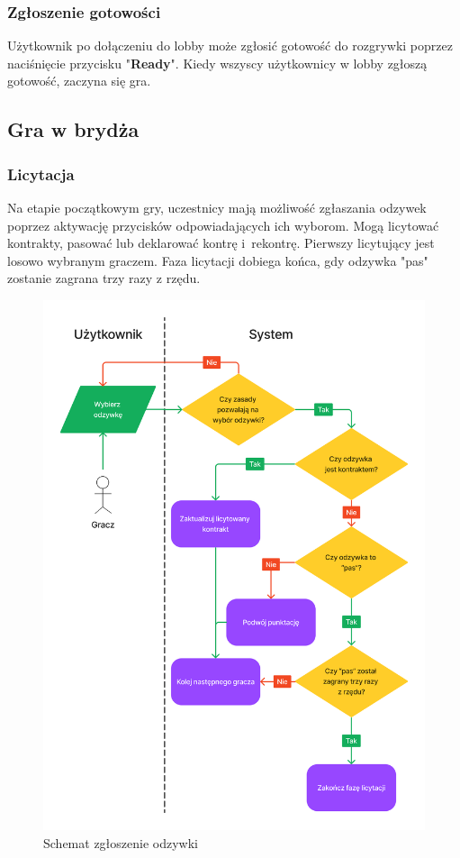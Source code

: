 \FloatBarrier

\subsubsection{Zgłoszenie gotowości}
Użytkownik po dołączeniu do lobby może zgłosić gotowość do rozgrywki poprzez
naciśnięcie przycisku "\textbf{Ready}". Kiedy wszyscy użytkownicy w lobby zgłoszą
gotowość, zaczyna się gra.

\subsection{Gra w brydża}

\subsubsection{Licytacja}
Na etapie początkowym gry, uczestnicy mają możliwość zgłaszania odzywek poprzez
aktywację przycisków odpowiadających ich wyborom. Mogą licytować kontrakty, pasować lub
deklarować kontrę i~rekontrę. Pierwszy licytujący jest losowo
wybranym graczem. Faza licytacji dobiega końca, gdy odzywka "pas" zostanie zagrana
trzy razy z rzędu.

\begin{figure}[!]
  \centering
  \includegraphics[width=\textwidth]{img/schematy/bid.png}
  \caption{Schemat zgłoszenie odzywki}
\end{figure}

